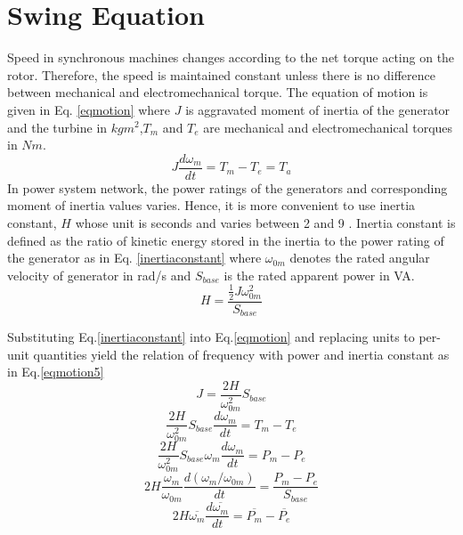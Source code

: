 \section{Swing Equation}
\label{swing}
Speed in synchronous machines changes according to the net torque acting on the rotor. Therefore, the speed is maintained constant unless there is no difference between mechanical and electromechanical torque. The equation of motion is given in Eq. \ref{eqmotion} where $J$ is aggravated moment of inertia of the generator and the turbine in $kgm^{2}$,$T_{m}$ and $T_{e}$ are mechanical and electromechanical torques in $Nm$.
\begin{equation}
J\frac{d\omega_{m}}{dt}=T_{m}-T_{e}=T_{a}
\label{eqmotion}
\end{equation}
In power system network, the power ratings of the generators and corresponding moment of inertia values varies. Hence, it is more convenient to use inertia constant, $H$ whose unit is seconds and varies between 2 and 9 \cite{Kundur}. Inertia constant is defined as the ratio of kinetic energy stored in the inertia to the power rating of the generator as in Eq. \ref{inertiaconstant} where $\omega_{0m}$ denotes the rated angular velocity of generator in rad/s and $S_{base}$ is the rated apparent power in VA. 
\begin{equation}
H=\frac{{\frac{1}{2}}J\omega_{0m}^{2}}{S_{base}}
\label{inertiaconstant}
\end{equation}

Substituting Eq.\ref{inertiaconstant} into Eq.\ref{eqmotion} and replacing units to per-unit quantities yield the relation of frequency with power and inertia constant as in Eq.\ref{eqmotion5}
\begin{equation}
J=\frac{2H}{\omega_{0m}^{2}}{S_{base}}
\label{inertiaconstant2}
\end{equation}
\begin{equation}
\frac{2H}{\omega_{0m}^{2}}{S_{base}}\frac{d\omega_{m}}{dt}=T_{m}-T_{e}
\label{eqmotion2}
\end{equation}
\begin{equation}
\frac{2H}{\omega_{0m}^{2}}{S_{base}\omega_{m}}\frac{d\omega_{m}}{dt}=P_{m}-P_{e}
\label{eqmotion3}
\end{equation}
\begin{equation}
2H\frac{\omega_{m}}{\omega_{0m}}\frac{d(\omega_{m}/\omega_{0m})}{dt}=\frac{P_{m}-P_{e}}{S_{base}}
\label{eqmotion4}
\end{equation}
\begin{equation}
2H\overline{\omega_{m}}\frac{d\overline{\omega_{m}}}{dt}=\overline{P_{m}}-\overline{P_{e}}
\label{eqmotion5}
\end{equation}
